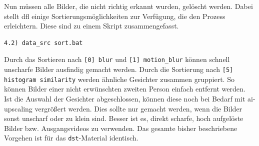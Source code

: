 Nun müssen alle Bilder, die nicht richtig erkannt wurden, gelöscht werden.
Dabei stellt \gls{dfl} einige Sortierungsmöglichkeiten zur Verfügung, die den Prozess erleichtern.
Diese sind zu einem Skript zusammengefasst.
\begin{lstlisting}[label={lst:extraction-4},numbers=none]
    4.2) data_src sort.bat
\end{lstlisting}
Durch das Sortieren nach \texttt{[0] blur} und \texttt{[1] motion\_blur} können schnell unscharfe Bilder ausfindig gemacht werden.
Durch die Sortierung nach \texttt{[5] histogram similarity} werden ähnliche Gesichter zusammen gruppiert.
So können Bilder einer nicht erwünschten zweiten Person einfach entfernt werden.\\
Ist die Auswahl der Gesichter abgeschlossen, können diese noch bei Bedarf mit \gls{ai-upscaling} vergrößert werden.
Dies sollte nur gemacht werden, wenn die Bilder sonst unscharf oder zu klein sind.
Besser ist es, direkt scharfe, hoch aufgelöste Bilder bzw. Ausgangsvideos zu verwenden.
Das gesamte bisher beschriebene Vorgehen ist für das \texttt{dst}-Material identisch.

